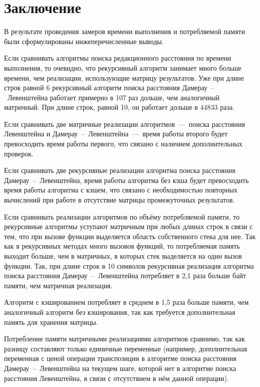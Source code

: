 \chapter*{Заключение}
В результате проведения замеров времени выполнения и потребляемой памяти были сформулированы нижеперечисленные выводы.

Если сравнивать алгоритмы поиска редакционного расстояния по времени выполнения, то очевидно, что рекурсивный алгоритм занимает много больше времени, чем реализации, использующие матрицу результатов. Уже при длине строк равной 6 рекурсивный алгоритм поиска расстояния Дамерау~--~Левенштейна работает примерно в 107 раз дольше, чем аналогичный матричный. При длине строк, равной 10, он работает дольше в 44833 раза. 

Если сравнивать две матричные реализации алгоритмов~---~поиска расстояния Левенштейна и Дамерау~--~Левенштейна~---~время работы второго будет превосходить время работы первого, что связано с наличием дополнительных проверок. 

Если сравнивать две рекурсивные реализации алгоритма поиска расстояния Дамерау~--~Левенштейна, время работы алгоритма без кэша будет превосходить время работы алгоритма с кэшем, что связано с необходимостью повторных вычислений при работе в отсутствие матрицы промежуточных результатов.

Если сравнивать реализации алгоритмов по объёму потребляемой памяти, то рекурсивные алгоритмы уступают матричным при любых длинах строк в связи с тем, что при вызове функции выделяется область собственного стека для нее. Так как в рекурсивных методах много вызовов функций, то потребляемая память выходит больше, чем в матричных, в которых стек выделяется на один вызов функции. Так, при длине строк в 10 символов рекурсивная реализация алгоритма поиска расстояния Дамерау~--~Левенштейна потребляет в 2,1 раза больше байт памяти, чем матричная реализация.

Алгоритм с кэшированием потребляет в среднем в 1,5 раза больше памяти, чем аналогичный алгоритм без кэширования, так как требуется дополнительная память для хранения матрицы.

Потребление памяти матричными реализациями алгоритмов сравнимо, так как разницу составляют только единичные переменные (например, дополнительная переменная с ценой операции транспозиции в алгоритме поиска расстояния Дамерау~--~Левенштейна на текущем шаге, которой нет в алгоритме поиска расстояния Левенштейна, в связи с отсутствием в нём данной операции).

